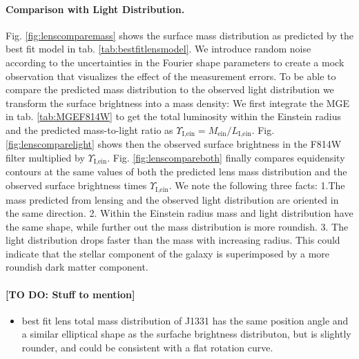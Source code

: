 
\paragraph{Comparison with Light Distribution.} Fig. \ref{fig:lenscomparemass} shows the surface mass distribution as predicted by the best fit model in tab. \ref{tab:bestfitlensmodel}. We introduce random noise according to the uncertainties in the Fourier shape parameters to create a mock observation that visualizes the effect of the measurement errors. To be able to compare the predicted mass distribution to the observed light distribution we transform the surface brightness into a mass density: We first integrate the MGE in tab. \ref{tab:MGEF814W} to get the total luminosity within the Einstein radius and the predicted mass-to-light ratio as $\Upsilon_\text{I,ein} = M_\text{ein} / L_\text{I,ein}$. Fig. \ref{fig:lenscomparelight} shows then the observed surface brightness in the F814W filter multiplied by $\Upsilon_\text{I,ein}$.  Fig. \ref{fig:lenscompareboth} finally compares equidensity contours at the same values of both the predicted lens mass distribution and the observed surface brightness times $\Upsilon_\text{I,ein}$. We note the following three facts: 1.The mass predicted from lensing and the observed light distribution are oriented in the same direction. 2. Within the Einstein radius mass and light distribution have the same shape, while further out the mass distribution is more roundish. 3. The light distribution drops faster than the mass with increasing radius. This could indicate that the stellar component of the galaxy is superimposed by a more roundish dark matter component.

\paragraph{[TO DO: Stuff to mention]}
\begin{itemize}
\item best fit lens total mass distribution of J1331 has the same position angle and a similar elliptical shape as the surfache brightness distributon, but is slightly rounder, and could be consistent with a flat rotation curve.
\end{itemize}


